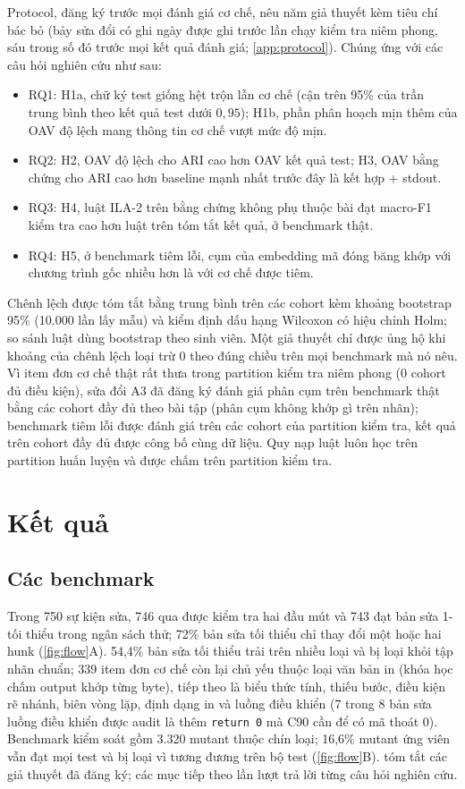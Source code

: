 \documentclass[a4paper,preprint,12pt,authoryear]{elsarticle}
\begin{document}
Protocol, đăng ký trước mọi đánh giá cơ chế, nêu năm giả thuyết kèm tiêu chí bác bỏ (bảy sửa đổi có ghi ngày được ghi trước lần chạy kiểm tra niêm phong, sáu trong số đó trước mọi kết quả đánh giá; \cref{app:protocol}). Chúng ứng với các câu hỏi nghiên cứu như sau:
\begin{itemize}
\item RQ1: H1a, chữ ký test giống hệt trộn lẫn cơ chế (cận trên 95\% của trần trung bình theo kết quả test dưới $0{,}95$); H1b, phần phân hoạch mịn thêm của OAV độ lệch mang thông tin cơ chế vượt mức độ mịn.
\item RQ2: H2, OAV độ lệch cho ARI cao hơn OAV kết quả test; H3, OAV bằng chứng cho ARI cao hơn baseline mạnh nhất trước đây là kết hợp + stdout.
\item RQ3: H4, luật ILA-2 trên bằng chứng không phụ thuộc bài đạt macro-F1 kiểm tra cao hơn luật trên tóm tắt kết quả, ở benchmark thật.
\item RQ4: H5, ở benchmark tiêm lỗi, cụm của embedding mã đóng băng khớp với chương trình gốc nhiều hơn là với cơ chế được tiêm.
\end{itemize}
Chênh lệch được tóm tắt bằng trung bình trên các cohort kèm khoảng bootstrap 95\% (10.000 lần lấy mẫu) và kiểm định dấu hạng Wilcoxon có hiệu chỉnh Holm; so sánh luật dùng bootstrap theo sinh viên. Một giả thuyết chỉ được ủng hộ khi khoảng của chênh lệch loại trừ 0 theo đúng chiều trên mọi benchmark mà nó nêu. Vì item đơn cơ chế thật rất thưa trong partition kiểm tra niêm phong (0 cohort đủ điều kiện), sửa đổi A3 đã đăng ký đánh giá phân cụm trên benchmark thật bằng các cohort đầy đủ theo bài tập (phân cụm không khớp gì trên nhãn); benchmark tiêm lỗi được đánh giá trên các cohort của partition kiểm tra, kết quả trên cohort đầy đủ được công bố cùng dữ liệu. Quy nạp luật luôn học trên partition huấn luyện và được chấm trên partition kiểm tra.

\section{Kết quả}\label{sec:results}

\subsection{Các benchmark}
Trong 750 sự kiện sửa, 746 qua được kiểm tra hai đầu mút và 743 đạt bản sửa 1-tối thiểu trong ngân sách thử; 72\% bản sửa tối thiểu chỉ thay đổi một hoặc hai hunk (\cref{fig:flow}A). 54,4\% bản sửa tối thiểu trải trên nhiều loại và bị loại khỏi tập nhãn chuẩn; 339 item đơn cơ chế còn lại chủ yếu thuộc loại văn bản in (khóa học chấm output khớp từng byte), tiếp theo là biểu thức tính, thiếu bước, điều kiện rẽ nhánh, biên vòng lặp, định dạng in và luồng điều khiển (7 trong 8 bản sửa luồng điều khiển được audit là thêm \texttt{return 0} mà C90 cần để có mã thoát 0). Benchmark kiểm soát gồm 3.320 mutant thuộc chín loại; 16,6\% mutant ứng viên vẫn đạt mọi test và bị loại vì tương đương trên bộ test (\cref{fig:flow}B).  tóm tắt các giả thuyết đã đăng ký; các mục tiếp theo lần lượt trả lời từng câu hỏi nghiên cứu.
\end{document}

